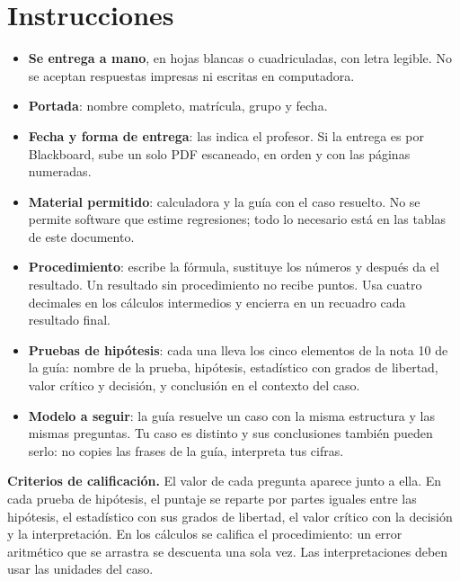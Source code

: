 \documentclass[11pt,letterpaper]{article}
\begin{document}

\section*{Instrucciones}

\begin{itemize}[itemsep=0.2em]
  \item \textbf{Se entrega a mano}, en hojas blancas o cuadriculadas, con letra legible. No se aceptan respuestas impresas ni escritas en computadora.
  \item \textbf{Portada}: nombre completo, matrícula, grupo y fecha.
  \item \textbf{Fecha y forma de entrega}: las indica el profesor. Si la entrega es por Blackboard, sube un solo PDF escaneado, en orden y con las páginas numeradas.
  \item \textbf{Material permitido}: calculadora y la guía con el caso resuelto. No se permite software que estime regresiones; todo lo necesario está en las tablas de este documento.
  \item \textbf{Procedimiento}: escribe la fórmula, sustituye los números y después da el resultado. Un resultado sin procedimiento no recibe puntos. Usa cuatro decimales en los cálculos intermedios y encierra en un recuadro cada resultado final.
  \item \textbf{Pruebas de hipótesis}: cada una lleva los cinco elementos de la nota 10 de la guía: nombre de la prueba, hipótesis, estadístico con grados de libertad, valor crítico y decisión, y conclusión en el contexto del caso.
  \item \textbf{Modelo a seguir}: la guía resuelve un caso con la misma estructura y las mismas preguntas. Tu caso es distinto y sus conclusiones también pueden serlo: no copies las frases de la guía, interpreta tus cifras.
\end{itemize}

\textbf{Criterios de calificación.} El valor de cada pregunta aparece junto a ella. En cada prueba de hipótesis, el puntaje se reparte por partes iguales entre las hipótesis, el estadístico con sus grados de libertad, el valor crítico con la decisión y la interpretación. En los cálculos se califica el procedimiento: un error aritmético que se arrastra se descuenta una sola vez. Las interpretaciones deben usar las unidades del caso.


\end{document}
